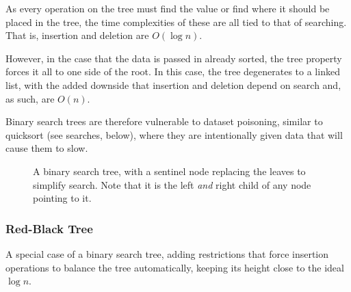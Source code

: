\documentclass[]{article}
\begin{document}
As every operation on the tree must find the value or find where it should be placed in the tree, the time complexities of these are all tied to that of searching. That is, insertion and deletion are $O(\log{n})$.

However, in the case that the data is passed in already sorted, the tree property forces it all to one side of the root. In this case, the tree degenerates to a linked list, with the added downside that insertion and deletion depend on search and, as such, are $O(n)$.

Binary search trees are therefore vulnerable to dataset poisoning, similar to quicksort (see searches, below), where they are intentionally given data that will cause them to slow.

\begin{figure}[h]
\centering
{}

\caption{A binary search tree, with a sentinel node replacing the leaves to simplify search. Note that it is the left \textit{and} right child of any node pointing to it.}
\end{figure}

\subsubsection{Red-Black Tree}

A special case of a binary search tree, adding restrictions that force insertion operations to balance the tree automatically, keeping its height close to the ideal $\log{n}$.
\end{document}
